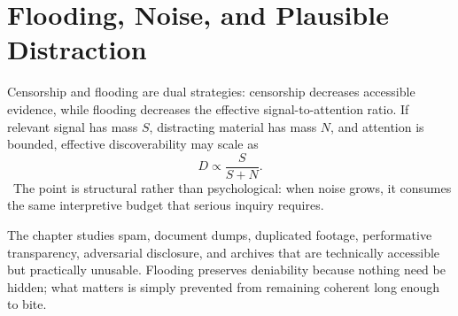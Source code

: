 
\chapter{Flooding, Noise, and Plausible Distraction}
\label{ch:ch026}

Censorship and flooding are dual strategies: censorship decreases accessible evidence, while flooding decreases the effective signal-to-attention ratio. If relevant signal has mass \(S\), distracting material has mass \(N\), and attention is bounded, effective discoverability may scale as
\[
D \propto \frac{S}{S+N}.
\]
\ToyModel\ The point is structural rather than psychological: when noise grows, it consumes the same interpretive budget that serious inquiry requires.

The chapter studies spam, document dumps, duplicated footage, performative transparency, adversarial disclosure, and archives that are technically accessible but practically unusable. Flooding preserves deniability because nothing need be hidden; what matters is simply prevented from remaining coherent long enough to bite.
